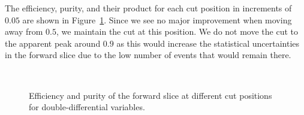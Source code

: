 \documentclass{article}
\begin{document}
The efficiency, purity, and their product for each cut position in increments of $0.05$ are shown 
in Figure~\ref{fig:cutscan-eff-purity}. Since we see no major improvement when moving away from $0.5$, we maintain the 
cut at this position. We do not move the cut to the apparent peak around $0.9$ as this would increase the statistical uncertainties
in the forward slice due to the low number of events that would remain there.

\begin{figure}[H]
    \centering
     \\
    \caption{Efficiency and purity of the forward slice at different cut positions for double-differential variables.}
    \label{fig:cutscan-eff-purity}
\end{figure}
\end{document}
